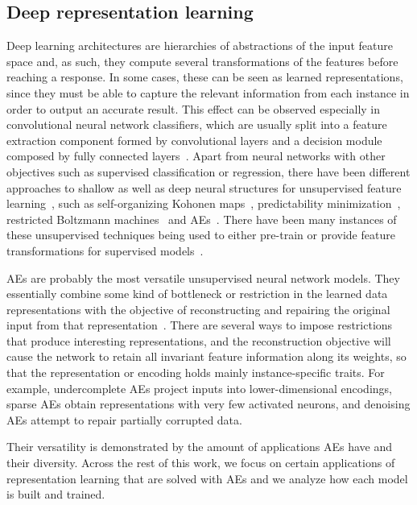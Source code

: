 \subsection{Deep representation learning}

Deep learning architectures are hierarchies of abstractions of the input feature space and, as such, they compute several transformations of the features before reaching a response. In some cases, these can be seen as learned representations, since they must be able to capture the relevant information from each instance in order to output an accurate result. This effect can be observed especially in convolutional neural network classifiers, which are usually split into a feature extraction component formed by convolutional layers and a decision module composed by fully connected layers~\cite{imagenet}. Apart from neural networks with other objectives such as supervised classification or regression, there have been different approaches to shallow as well as deep neural structures for unsupervised feature learning~\cite{reviewdl}, such as self-organizing Kohonen maps~\cite{kohonen1990self,koikkalainen1990self}, predictability minimization~\cite{schmidhuber1996semilinear}, restricted Boltzmann machines~\cite{DLBookRBM} and AEs~\cite{kramer1991nonlinear,oja1991}. There have been many instances of these unsupervised techniques being used to either pre-train or provide feature transformations for supervised models~\cite{bengio2012deep}.

AEs are probably the most versatile unsupervised neural network models. They essentially combine some kind of bottleneck or restriction in the learned data representations with the objective of reconstructing and repairing the original input from that representation~\cite{charte-tutorial}. There are several ways to impose restrictions that produce interesting representations, and the reconstruction objective will cause the network to retain all invariant feature information along its weights, so that the representation or encoding holds mainly instance-specific traits. For example, undercomplete AEs project inputs into lower-dimensional encodings, sparse AEs obtain representations with very few activated neurons, and denoising AEs attempt to repair partially corrupted data.

Their versatility is demonstrated by the amount of applications AEs have and their diversity. Across the rest of this work, we focus on certain applications of representation learning that are solved with AEs and we analyze how each model is built and trained. 


